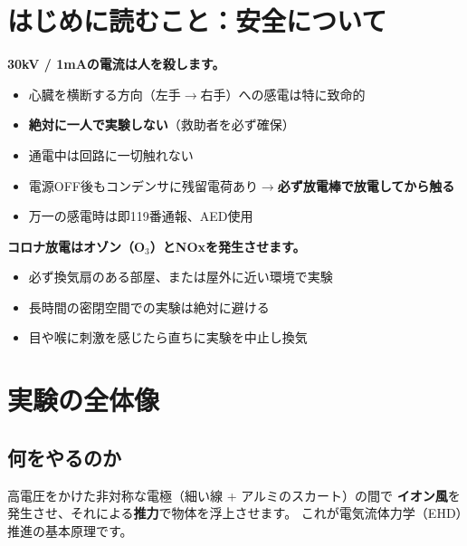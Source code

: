 \documentclass[12pt,a4paper]{ltjsarticle}
\begin{document}
\section*{\color{danger} はじめに読むこと：安全について}

\begin{dangerbox}
\textbf{\Large 30kV / 1mAの電流は人を殺します。}

\begin{itemize}[leftmargin=2em]
  \item 心臓を横断する方向（左手$\to$右手）への感電は特に致命的
  \item \textbf{絶対に一人で実験しない}（救助者を必ず確保）
  \item 通電中は回路に一切触れない
  \item 電源OFF後もコンデンサに残留電荷あり$\to$\textbf{必ず放電棒で放電してから触る}
  \item 万一の感電時は即119番通報、AED使用
\end{itemize}
\end{dangerbox}

\begin{warningbox}
\textbf{コロナ放電はオゾン（O$_3$）とNOxを発生させます。}
\begin{itemize}[leftmargin=2em]
  \item 必ず換気扇のある部屋、または屋外に近い環境で実験
  \item 長時間の密閉空間での実験は絶対に避ける
  \item 目や喉に刺激を感じたら直ちに実験を中止し換気
\end{itemize}
\end{warningbox}

\newpage
\section{実験の全体像}

\subsection{何をやるのか}

高電圧をかけた非対称な電極（細い線 + アルミのスカート）の間で
\textbf{イオン風}を発生させ、それによる\textbf{推力}で物体を浮上させます。
これが電気流体力学（EHD）推進の基本原理です。
\end{document}
